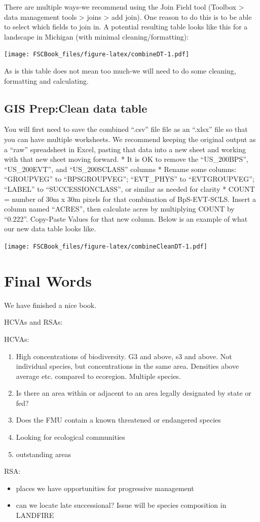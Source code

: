 \documentclass[
]{book}
\providecommand{\tightlist}{%
  \setlength{\itemsep}{0pt}\setlength{\parskip}{0pt}}
\begin{document}
There are multiple ways-we recommend using the Join Field tool (Toolbox \textgreater{} data management tools \textgreater{} joins \textgreater{} add join). One reason to do this is to be able to select which fields to join in. A potential resulting table looks like this for a landscape in Michigan (with minimal cleaning/formatting):

\texttt{[image: FSCBook\_files/figure-latex/combineDT-1.pdf]}

As is this table does not mean too much-we will need to do some cleaning, formatting and calculating.

\hypertarget{gis-prepclean-data-table}{%
\section{GIS Prep:Clean data table}\label{gis-prepclean-data-table}}

You will first need to save the combined ``.csv'' file file as an ``.xlsx'' file so that you can have multiple worksheets. We recommend keeping the original output as a ``raw'' spreadsheet in Excel, pasting that data into a new sheet and working with that new sheet moving forward.
* It is OK to remove the ``US\_200BPS'', ``US\_200EVT'', and ``US\_200SCLASS'' columns
* Rename some columns: ``GROUPVEG'' to ``BPSGROUPVEG''; ``EVT\_PHYS'' to ``EVTGROUPVEG''; ``LABEL'' to ``SUCCESSIONCLASS'', or similar as needed for clarity
* COUNT = number of 30m x 30m pixels for that combination of BpS-EVT-SCLS. Insert a column named ``ACRES'', then calculate acres by multiplying COUNT by ``0.222''. Copy-Paste Values for that new column. Below is an example of what our new data table looks like.

\texttt{[image: FSCBook\_files/figure-latex/combineCleanDT-1.pdf]}

\hypertarget{final-words}{%
\chapter{Final Words}\label{final-words}}

We have finished a nice book.

HCVAs and RSAs:

HCVAs:

\begin{enumerate}
\def\labelenumi{\arabic{enumi}.}
\tightlist
\item
  High concentrations of biodiversity. G3 and above, s3 and above. Not individual species, but concentrations in the same area. Densities above average etc. compared to ecoregion. Multiple species.
\item
  Is there an area within or adjacent to an area legally designated by state or fed?\\
\item
  Does the FMU contain a known threatened or endangered species
\item
  Looking for ecological communities
\item
  outstanding areas
\end{enumerate}

RSA:

\begin{itemize}
\tightlist
\item
  places we have opportunities for progressive management
\item
  can we locate late successional? Issue will be species composition in LANDFIRE
\end{itemize}
\end{document}
